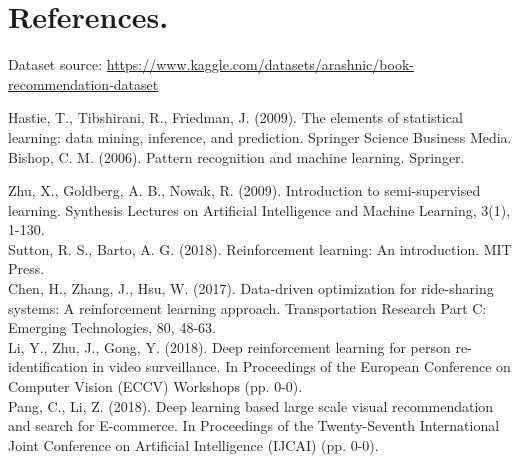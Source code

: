 \newpage
\section*{References.}
\renewcommand\refname{}
%


\begin{thebibliography}{00}






Dataset source: \url{ https://www.kaggle.com/datasets/arashnic/book-recommendation-dataset}

Hastie, T., Tibshirani, R., Friedman, J. (2009). The elements of statistical learning: data mining, inference, and prediction. Springer Science Business Media.\\

Bishop, C. M. (2006). Pattern recognition and machine learning. Springer.

Zhu, X., Goldberg, A. B., Nowak, R. (2009). Introduction to semi-supervised learning. Synthesis Lectures on Artificial Intelligence and Machine Learning, 3(1), 1-130.\\

Sutton, R. S.,  Barto, A. G. (2018). Reinforcement learning: An introduction. MIT Press. \\

Chen, H., Zhang, J., Hsu, W. (2017). Data-driven optimization for ride-sharing systems: A reinforcement learning approach. Transportation Research Part C: Emerging Technologies, 80, 48-63.\\
Li, Y., Zhu, J., Gong, Y. (2018). Deep reinforcement learning for person re-identification in video surveillance. In Proceedings of the European Conference on Computer Vision (ECCV) Workshops (pp. 0-0).\\
Pang, C., Li, Z. (2018). Deep learning based large scale visual recommendation and search for E-commerce. In Proceedings of the Twenty-Seventh International Joint Conference on Artificial Intelligence (IJCAI) (pp. 0-0).\\


\end{thebibliography}
